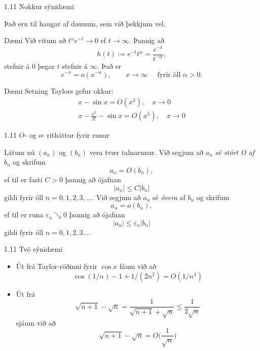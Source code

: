 %
\begin{frame}{1.11 Nokkur sýnidæmi} 

Það eru til haugar af dæmum, sem við þekkjum vel. \pause

\begin{block}{Dæmi}
Við vitum að 
$t^{\alpha}e^{-t} \to 0$ ef $t\to\infty$. Þannig að 
$$
h(t):= e^{-t}t^\alpha = \frac{e^{-t}}{t^{-\alpha}},
$$
stefnir á $0$ þegar $t$ stefnir á $\infty$. \pause
Það er 
\begin{equation*}
    e^{-x} = o(x^{-\alpha}), 
    \qquad x\to \infty \quad \text{  fyrir öll }
    \alpha > 0.
\end{equation*}
\end{block}

\pause
\begin{block}{Dæmi}
Setning Taylors gefur okkur:
\begin{gather*}
    x - \sin x = O(x^3), \quad x \to 0\\
    x - \frac{x^3}{3!} - \sin x = O(x^5), \quad x \to 0
\end{gather*}
\end{block}
\end{frame}
%

%
\begin{frame}{1.11 $O$- og $o$- ritháttur fyrir runur} 


Látum nú $(a_n)$ og $(b_n)$ vera tvær talnarunur. 
Við segjum að $a_n$ {\it sé stórt O af} $b_n$ og skrifum 
\begin{equation*}
    a_n = O(b_n), 
\end{equation*}
ef til er fasti $C>0$ þannig að ójafnan
\begin{equation*}
    |a_n| \leq C|b_n|
\end{equation*}
gildi fyrir öll $n=0,1,2,3,\dots$. Við segjum að $a_n$ sé {\it óvera} af $b_n$ og skrifum
\begin{equation*}
    a_n = o(b_n), 
\end{equation*}
ef til er runa $\varepsilon_n\searrow 0$ þannig að ójafnan 
\begin{equation*}
    |a_n|\leq \varepsilon_n|b_n|
\end{equation*}
gildi fyrir öll $n=0,1,2,3\dots$.

\end{frame}

%
\begin{frame}{1.11 Tvö sýnidæmi} 
\begin{itemize}
 \item Út frá Taylor-röðinni fyrir $\cos x$ fáum við að
\begin{equation*}
    \cos(1/n)-1+1/(2n^2) = O(1/n^4)
\end{equation*} \pause
\item Út frá 
\begin{equation*}
    \sqrt{n+1}-\sqrt n = \dfrac{1}{\sqrt{n+1}+\sqrt n} \leq \frac{1}{2\sqrt n}
\end{equation*}\pause
sjáum við að
\begin{equation*}
    \sqrt{n+1}-\sqrt n = O\big(\dfrac 1{\sqrt n}\big)
\end{equation*}
\end{itemize}
\end{frame}


